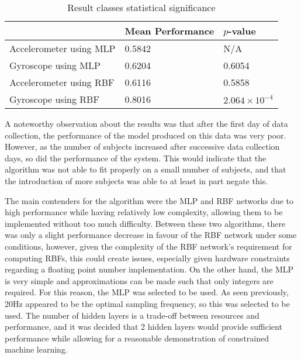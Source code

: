 \begin{table}
	\centering
	\begin{tabular}{l|ll}
		& Mean Performance & $p$-value \\
		\hline
		Accelerometer using MLP & 0.5842 & N/A \\
		Gyroscope using MLP     & 0.6204 & 0.6054 \\
		Accelerometer using RBF & 0.6116 & 0.5858 \\
		Gyroscope using RBF     & 0.8016 & $2.064 \times 10^{-4}$ \\        
	\end{tabular}
	\caption{Result classes statistical significance \label{tab:res-ttest}}
\end{table}

A noteworthy observation about the results was that after the first day of data collection, the performance of the model produced on this data was very poor. However, as the number of subjects increased after successive data collection days, so did the performance of the system. This would indicate that the algorithm was not able to fit properly on a small number of subjects, and that the introduction of more subjects was able to at least in part negate this.

The main contenders for the algorithm were the MLP and RBF networks due to high performance while having relatively low complexity, allowing them to be implemented without too much difficulty. Between these two algorithms, there was only a slight performance decrease in favour of the RBF network under some conditions, however, given the complexity of the RBF network's requirement for computing RBFs, this could create issues, especially given hardware constraints regarding a floating point number implementation. On the other hand, the MLP is very simple and approximations can be made such that only integers are required. For this reason, the MLP was selected to be used. As seen previously, 20Hz appeared to be the optimal sampling frequency, so this was selected to be used. The number of hidden layers is a trade-off between resources and performance, and it was decided that 2 hidden layers would provide sufficient performance while allowing for a reasonable demonstration of constrained machine learning.

